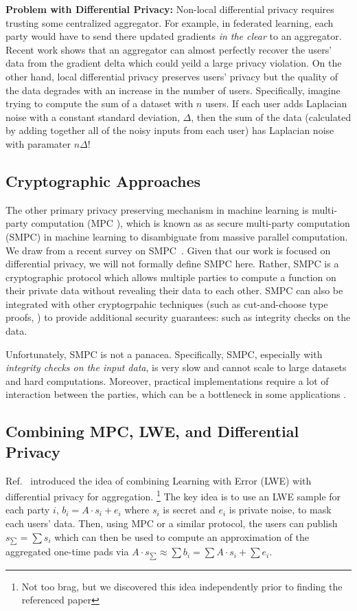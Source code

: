 \documentclass[11pt]{article}
\begin{document}
\textbf{Problem with Differential Privacy:} Non-local differential privacy requires trusting some centralized aggregator.
For example, in federated learning, each party would have to send there updated gradients \emph{in the clear} to an aggregator.
Recent work  shows that an aggregator can almost perfectly recover the users' data from the gradient delta which could yeild a large privacy violation.
On the other hand, local differential privacy preserves users' privacy but the quality of the data degrades with an increase in the number of users.
Specifically, imagine trying to compute the sum of a dataset with $n$ users.
If each user adds Laplacian noise with a constant standard deviation, $\Delta$, then the sum of the data (calculated by adding together all of the noisy inputs from each user) has Laplacian noise with paramater $n \Delta$!

\subsection{Cryptographic Approaches}
The other primary privacy preserving mechanism in machine learning is multi-party computation (MPC ), which is known as as secure multi-party computation (SMPC) in machine learning to disambiguate from massive parallel computation.
We draw from a recent survey on SMPC~\cite{zhou2024secure}.
Given that our work is focused on differential privacy, we will not formally define SMPC here.
Rather, SMPC is a cryptographic protocol which allows multiple parties to compute a function on their private data without revealing their data to each other.
SMPC can also be integrated with other cryptogrpahic techniques (such as cut-and-choose type proofs, ) to provide additional security guarantees: such as integrity checks on the data.

Unfortunately, SMPC is not a panacea.
Specifically, SMPC, especially with \emph{integrity checks on the input data}, is very slow and cannot scale to large datasets and hard computations.
Moreover, practical implementations require a lot of interaction between the parties, which can be a bottleneck in some applications \cite{zhao2019secure}.

\subsection{Combining MPC, LWE, and Differential Privacy}
Ref.~\cite{stevens2021efficientdifferentiallyprivatesecure} introduced the idea of combining Learning with Error (LWE) with differential privacy for aggregation.
\footnote{Not too brag, but we discovered this idea independently prior to finding the referenced paper}
The key idea is to use an LWE sample for each party $i$, $b_i = A \cdot s_i + e_i$ where $s_i$ is secret and $e_i$ is private noise, to mask each users' data.
Then, using MPC or a similar protocol, the users can publish $s_{\sum} = \sum s_i$ which can then be used to compute an approximation of the aggregated one-time pads via $A \cdot s_{\sum} \approx \sum b_i = \sum A \cdot s_i + \sum e_i$.
\end{document}

